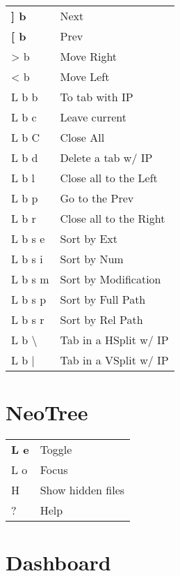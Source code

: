 \documentclass[
  ,landscape
  ,columns=4
]{cheatsheet}
\begin{document}
\begin{tabular}{ll}
	\textbf{{]} b}     & Next                   \\
	\textbf{{[} b}     & Prev                   \\
	> b                & Move Right             \\
	< b                & Move Left              \\
	L b b              & To tab with IP         \\
	L b c              & Leave current          \\
	L b C              & Close All              \\
	L b d              & Delete a tab w/ IP     \\
	L b l              & Close all to the Left  \\
	L b p              & Go to the Prev         \\
	L b r              & Close all to the Right \\
	L b s e            & Sort by Ext            \\
	L b s i            & Sort by Num            \\
	L b s m            & Sort by Modification   \\
	L b s p            & Sort by Full Path      \\
	L b s r            & Sort by Rel Path       \\
	L b \textbackslash & Tab in a HSplit w/ IP  \\
	L b {|}            & Tab in a VSplit w/ IP  \\
\end{tabular}

\section{NeoTree}

\begin{tabular}{ll}
	\textbf{L e} & Toggle            \\
	L o          & Focus             \\
	H            & Show hidden files \\
	?            & Help              \\
\end{tabular}

\section{Dashboard}
\end{document}
